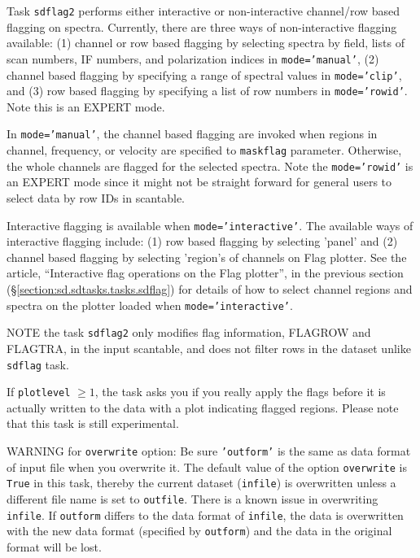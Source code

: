 Task {\tt sdflag2} performs either interactive or non-interactive channel/row 
based flagging on spectra. 
Currently, there are three ways of non-interactive flagging available: 
(1) channel or row based flagging by selecting spectra by field,
lists of scan numbers, IF numbers, and polarization indices in {\tt mode='manual'},
(2) channel based flagging by specifying a range of spectral values in
{\tt mode='clip'}, and 
(3) row based flagging by specifying a list of row numbers in 
{\tt mode='rowid'}. Note this is an EXPERT mode.

In {\tt mode='manual'}, the channel based flagging are invoked when regions
in channel, frequency, or velocity are specified to {\tt maskflag} parameter. 
Otherwise, the whole channels are flagged for the selected spectra.
Note the {\tt mode='rowid'} is an EXPERT mode since it might not be straight
forward for general users to select data by row IDs in scantable.

Interactive flagging is available when {\tt mode='interactive'}. 
The available ways of interactive flagging include: 
(1) row based flagging by selecting 'panel' and (2) channel
based flagging by selecting 'region's of channels on Flag plotter. 
See the article, ``Interactive flag operations on the Flag plotter'', 
in the previous section (\S \ref{section:sd.sdtasks.tasks.sdflag}) for details of how to select channel regions and spectra on the plotter loaded when {\tt mode='interactive'}.


NOTE the task {\tt sdflag2} only modifies flag information, FLAGROW and FLAGTRA, 
in the input scantable, and does not filter rows in the dataset unlike
{\tt sdflag} task.

If {\tt plotlevel} $ \ge 1 $, the task asks you if you really apply the 
flags before it is actually written to the data with a plot 
indicating flagged regions.
Please note that this task is still experimental.

WARNING for {\tt overwrite} option:
Be sure {\tt 'outform'} is the same as data format of input file when you
overwrite it. The default value of the option {\tt overwrite}
is {\tt True} in this task, thereby the current dataset ({\tt infile}) is 
overwritten unless a different file name is set to {\tt outfile}. 
There is a known issue in overwriting {\tt infile}. If {\tt outform} differs to the
data format of {\tt infile}, the data is overwritten with the new data format 
(specified by {\tt outform}) and the data in the original format will be lost.

